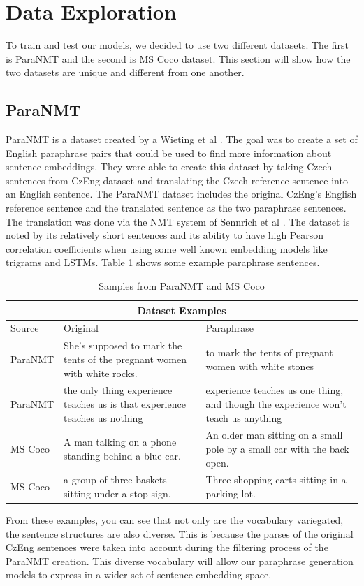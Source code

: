 \documentclass{article}
\begin{document}
\section{Data Exploration}
To train and test our models, we decided to use two different datasets. The first is ParaNMT and the second is MS Coco dataset. This section will show how the two datasets are unique and different from one another.
\subsection{ParaNMT} 
ParaNMT is a dataset created by a Wieting et al \cite{wieting2017paranmt50m}. The goal was to create a set of English paraphrase pairs that could be used to find more information about sentence embeddings. They were able to create this dataset by taking Czech sentences from CzEng dataset \cite{Bojar2016CzEng1E} and translating the Czech reference sentence into an English sentence. The ParaNMT dataset includes the original CzEng's English reference sentence and the translated sentence as the two paraphrase sentences. The translation was done via the NMT system of Sennrich et al \cite{sennrich2017nematus}.
The dataset is noted by its relatively short sentences and its ability to have high Pearson correlation coefficients when using some well known embedding models like trigrams and LSTMs. Table 1 shows  some example paraphrase sentences.
\begin{table}
\small
\begin{center}
\begin{tabular}{ |p{2cm}|p{4.5cm}|p{4.5cm}|  }
\hline
\multicolumn{3}{|c|}{Dataset Examples} \\
\hline
Source & Original & Paraphrase \\
\hline
ParaNMT & She's supposed to mark the tents of the pregnant women with white rocks. & to mark the tents of pregnant women with white stones\\
\hline
ParaNMT & the only thing experience teaches us is that experience teaches us nothing & experience teaches us one thing, and though the experience won't teach us anything \\
\hline
MS Coco & A man talking on a phone standing behind a blue car. & An older man sitting on a small pole by a small car with the back open.\\
\hline
MS Coco & a group of three baskets sitting under a stop sign. & Three shopping carts sitting in a parking lot. \\
\hline
\end{tabular}
\end{center}
\caption{Samples from ParaNMT and MS Coco}
\end{table}
\par From these examples, you can see that not only are the vocabulary variegated, the sentence structures are also diverse. This is because the parses of the original CzEng sentences were taken into account during the filtering process of the ParaNMT creation. This diverse vocabulary will allow our paraphrase generation models to express in a wider set of sentence embedding space. 
\end{document}
